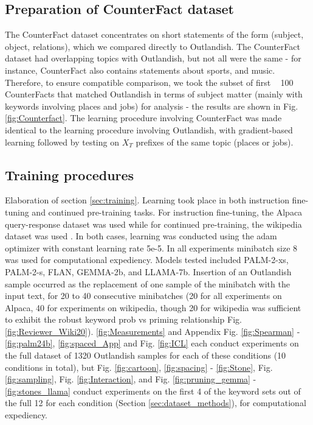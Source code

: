 \documentclass[11pt, a4paper, logo, copyright]{googledeepmind}
\theoremstyle{plain}
\theoremstyle{definition}
\theoremstyle{remark}
\begin{document}
\subsection{Preparation of CounterFact dataset}
\label{sec:CounterFact}
The CounterFact dataset concentrates on short statements of the form (subject, object, relations), which we compared directly to Outlandish. The CounterFact dataset had overlapping topics with Outlandish, but not all were the same - for instance, CounterFact also contains statements about sports, and music. Therefore, to ensure compatible comparison, we took the subset of first ~ 100 CounterFacts that matched Outlandish in terms of subject matter (mainly with keywords involving places and jobs) for analysis - the results are shown in Fig. \ref{fig:Counterfact}. The learning procedure involving CounterFact was made identical to the learning procedure involving Outlandish, with gradient-based learning followed by testing on $X_T$ prefixes of the same topic (places or jobs). 


\subsection{Training procedures}
\label{sec:training_methods}
Elaboration of section \ref{sec:training}. Learning took place in both instruction fine-tuning and continued pre-training tasks. For instruction fine-tuning, the Alpaca query-response dataset \citep{alpaca} was used while for continued pre-training, the wikipedia dataset was used \citep{wikidump}. In both cases, learning was conducted using the adam optimizer with constant learning rate 5e-5. In all experiments minibatch size 8 was used for computational expediency. Models tested included PALM-2-xs, PALM-2-s, FLAN, GEMMA-2b, and LLAMA-7b. Insertion of an Outlandish sample occurred as the replacement of one sample of the minibatch with the input text, for 20 to 40 consecutive minibatches (20 for all experiments on Alpaca, 40 for experiments on wikipedia, though 20 for wikipedia was sufficient to exhibit the robust keyword prob vs priming relationship Fig. \ref{fig:Reviewer_Wiki20}). \ref{fig:Measurements} and Appendix Fig. \ref{fig:Spearman} - \ref{fig:palm24b}, \ref{fig:spaced_App} and Fig. \ref{fig:ICL} each conduct experiments on the full dataset of 1320 Outlandish samples for each of these conditions (10 conditions in total), but Fig. \ref{fig:cartoon}, \ref{fig:spacing} - \ref{fig:Stone}, Fig. \ref{fig:sampling}, Fig. \ref{fig:Interaction}, and Fig.  \ref{fig:pruning_gemma} - \ref{fig:stones_llama}  conduct experiments on the first 4 of the keyword sets out of the full 12 for each condition (Section \ref{sec:dataset_methods}), for computational expediency. 
\end{document}
